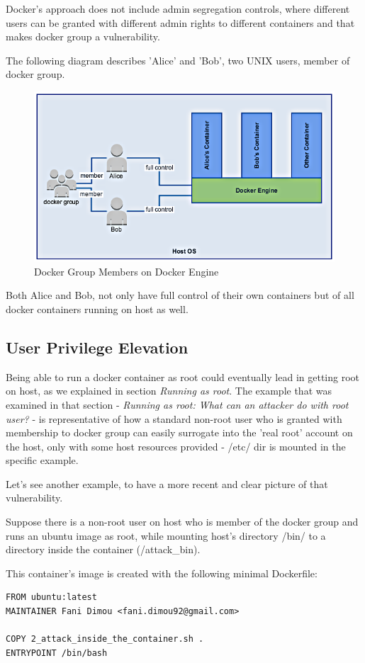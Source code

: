 Docker's approach does not include admin segregation controls, where different users can be granted with different admin rights to different containers and that makes docker group a vulnerability.

The following diagram describes 'Alice' and 'Bob', two UNIX users, member of docker group.

\begin{figure}[h!]
  \centering
   \includegraphics[width=0.85\linewidth]{./figures/dockergroupgm.png}
   \caption{Docker Group Members on Docker Engine}
\end{figure}

Both Alice and Bob, not only have full control of their own containers but of all docker containers running on host as well.

\subsection{User Privilege Elevation}
Being able to run a docker container as root could eventually lead in getting root on host, as we explained in section \textit{Running as root}. The example that was examined in that section - \textit{Running as root: What can an attacker do with root user?} - is representative of how a standard non-root user who is granted with membership to docker group can easily surrogate into the 'real root' account on the host, only with some host resources provided - /etc/ dir is mounted in the specific example.

Let's see another example, to have a more recent and clear picture of that vulnerability.

Suppose there is a non-root user on host who is member of the docker group and runs an ubuntu image as root, while mounting host's directory /bin/ to a directory inside the container (/attack\_bin). 

This container's image is created with the following minimal Dockerfile:
\hfill\break\hfill\break
\begin{lstlisting}[style=Dockerfile, caption={Dockerfile used for docgroup image}]
FROM ubuntu:latest
MAINTAINER Fani Dimou <fani.dimou92@gmail.com>

COPY 2_attack_inside_the_container.sh .
ENTRYPOINT /bin/bash
\end{lstlisting}

